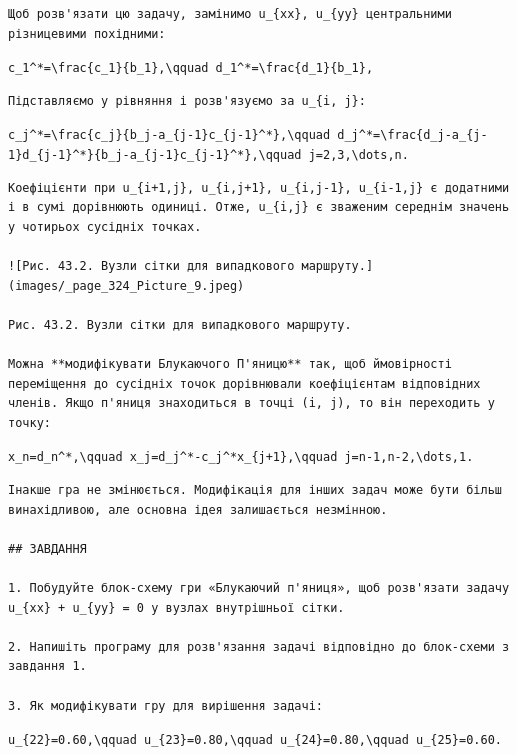 \documentclass[
  ukrainian,
]{article}
\begin{document}
\begin{verbatim}
Щоб розв'язати цю задачу, замінимо u_{xx}, u_{yy} центральними різницевими похідними:
\end{verbatim}

\texttt{c\_1\^{}*=\textbackslash{}frac\{c\_1\}\{b\_1\},\textbackslash{}qquad\ d\_1\^{}*=\textbackslash{}frac\{d\_1\}\{b\_1\},}

\begin{verbatim}
Підставляємо у рівняння і розв'язуємо за u_{i, j}:
\end{verbatim}

\texttt{c\_j\^{}*=\textbackslash{}frac\{c\_j\}\{b\_j-a\_\{j-1\}c\_\{j-1\}\^{}*\},\textbackslash{}qquad\ d\_j\^{}*=\textbackslash{}frac\{d\_j-a\_\{j-1\}d\_\{j-1\}\^{}*\}\{b\_j-a\_\{j-1\}c\_\{j-1\}\^{}*\},\textbackslash{}qquad\ j=2,3,\textbackslash{}dots,n.}

\begin{verbatim}
Коефіцієнти при u_{i+1,j}, u_{i,j+1}, u_{i,j-1}, u_{i-1,j} є додатними і в сумі дорівнюють одиниці. Отже, u_{i,j} є зваженим середнім значень у чотирьох сусідніх точках.

![Рис. 43.2. Вузли сітки для випадкового маршруту.](images/_page_324_Picture_9.jpeg)

Рис. 43.2. Вузли сітки для випадкового маршруту.

Можна **модифікувати Блукаючого П'яницю** так, щоб ймовірності переміщення до сусідніх точок дорівнювали коефіцієнтам відповідних членів. Якщо п'яниця знаходиться в точці (i, j), то він переходить у точку:
\end{verbatim}

\texttt{x\_n=d\_n\^{}*,\textbackslash{}qquad\ x\_j=d\_j\^{}*-c\_j\^{}*x\_\{j+1\},\textbackslash{}qquad\ j=n-1,n-2,\textbackslash{}dots,1.}

\begin{verbatim}
Інакше гра не змінюється. Модифікація для інших задач може бути більш винахідливою, але основна ідея залишається незмінною.

## ЗАВДАННЯ

1. Побудуйте блок-схему гри «Блукаючий п'яниця», щоб розв'язати задачу u_{xx} + u_{yy} = 0 у вузлах внутрішньої сітки.

2. Напишіть програму для розв'язання задачі відповідно до блок-схеми з завдання 1.

3. Як модифікувати гру для вирішення задачі:
\end{verbatim}

\texttt{u\_\{22\}=0.60,\textbackslash{}qquad\ u\_\{23\}=0.80,\textbackslash{}qquad\ u\_\{24\}=0.80,\textbackslash{}qquad\ u\_\{25\}=0.60.}
\end{document}
